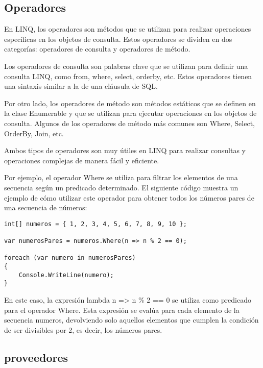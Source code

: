 \documentclass[executivepaper]{article}
\begin{document}
\subsection*{Operadores}

En LINQ, los operadores son métodos que se utilizan para realizar operaciones específicas en los objetos de consulta. Estos operadores se dividen en dos categorías: operadores de consulta y operadores de método.

Los operadores de consulta son palabras clave que se utilizan para definir una consulta LINQ, como from, where, select, orderby, etc. Estos operadores tienen una sintaxis similar a la de una cláusula de SQL.

Por otro lado, los operadores de método son métodos estáticos que se definen en la clase Enumerable y que se utilizan para ejecutar operaciones en los objetos de consulta. Algunos de los operadores de método más comunes son Where, Select, OrderBy, Join, etc.

Ambos tipos de operadores son muy útiles en LINQ para realizar consultas y operaciones complejas de manera fácil y eficiente.

Por ejemplo, el operador Where se utiliza para filtrar los elementos de una secuencia según un predicado determinado. El siguiente código muestra un ejemplo de cómo utilizar este operador para obtener todos los números pares de una secuencia de números:

\begin{lstlisting}
int[] numeros = { 1, 2, 3, 4, 5, 6, 7, 8, 9, 10 };

var numerosPares = numeros.Where(n => n % 2 == 0);

foreach (var numero in numerosPares)
{
    Console.WriteLine(numero);
}
\end{lstlisting}

En este caso, la expresión lambda n => n \% 2 == 0 se utiliza como predicado para el operador Where. Esta expresión se evalúa para cada elemento de la secuencia numeros, devolviendo solo aquellos elementos que cumplen la condición de ser divisibles por 2, es decir, los números pares.

\subsection*{proveedores}
\end{document}
